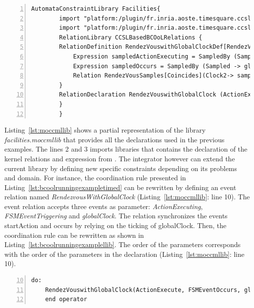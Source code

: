 \begin{lstlisting}[language=moccml,
		caption={Facilities Library in \moccml},
		label={lst:moccmllib}, 
		basicstyle=\scriptsize\ttfamily, backgroundcolor=\color{LGrey}, numbers=left, xleftmargin=2pt]
		AutomataConstraintLibrary Facilities{ 
		import "platform:/plugin/fr.inria.aoste.timesquare.ccslkernel.model/ccsllibrary/kernel.ccslLib" as kernel;
		import "platform:/plugin/fr.inria.aoste.timesquare.ccslkernel.model/ccsllibrary/CCSL.ccslLib" as CCSLLib;
		RelationLibrary CCSLBasedBCOoLRelations {
		RelationDefinition RendezVouswithGlobalClockDef[RendezVouswithGlobalClock]{ 
			Expression sampledActionExecuting = SampledBy (Sampled -> globalClock, Trigger-> ActionExecuting)
			Expression sampledOccurs = SampledBy (Sampled -> globalClock, Trigger-> FSMEventTriggering)
			Relation RendezVousSamples[Coincides](Clock2-> sampledActionExecuting , Clock1->FSMEventTriggering)
		}
		RelationDeclaration RendezVouswithGlobalClock (ActionExecuting: clock , FSMEventTriggering: clock, globalClock: clock)
		}
		}
\end{lstlisting}

Listing~\ref{lst:moccmllib} shows a partial representation of the \moccml library \emph{facilities.moccmllib} that provides all the declarations used in the previous examples. The lines 2 and 3 imports \ccsl libraries that contains the declaration of the kernel relations and expression from \ccsl. The integrator however can extend the current library by defining new specific constraints depending on its problems and domain. For instance, the coordination rule presented in Listing~\ref{lst:bcoolrunningexampletimed} can be rewritten by defining an event relation named \emph{RendezvousWithGlobalClock} (Listing~\ref{lst:moccmllib}: line 10). The event relation accepts three events as parameter: \emph{ActionExecuting}, \emph{FSMEventTriggering} and \emph{globalClock}. The relation synchronizes the events startAction and occurs by relying on the ticking of globalClock. Then, the coordination rule can be rewritten as shown in Listing~\ref{lst:bcoolrunningexamplellib}. The order of the parameters corresponds with the order of the parameters in the declaration (Listing~\ref{lst:moccmllib}: line 10). 

	\begin{lstlisting}[language=bcool,
	caption={Synchronized product operator between the TFSM and Activity languages by using the library},
	label={lst:bcoolrunningexamplellib}, 
	basicstyle=\scriptsize\ttfamily, backgroundcolor=\color{LGrey}, numbers=left, firstnumber=10, xleftmargin=2pt]
	do: 
	RendezVouswithGlobalClock(ActionExecute, FSMEventOccurs, globalClock)
	end operator
	\end{lstlisting}

